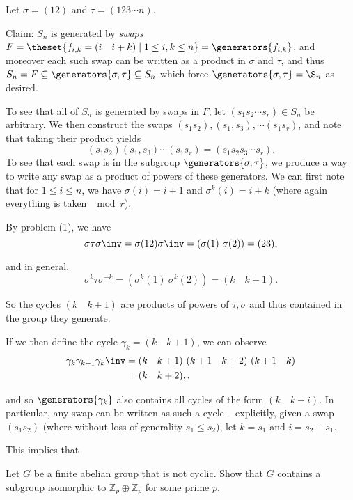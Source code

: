 \begin{solution}
  Let $\sigma= (12)$ and $\tau= (123\cdots n)$.

  Claim: $S_n$ is generated by \textit{swaps} $F = \theset{f_{i, k} = (i \quad i+k) \mid 1 \leq i, k \leq n} = \generators{f_{i, k}}$, and moreover each such swap can be written as a product in $\sigma$ and $\tau$, and thus $S_n = F \subseteq \generators{\sigma, \tau} \subseteq S_n$ which force $\generators{\sigma, \tau} = \S_n$ as desired.

  To see that all of $S_n$ is generated by swaps in $F$, let $(s_1 s_2 \cdots s_r) \in S_n$ be arbitrary. We then construct the swaps $(s_1 s_2), (s_1, s_3), \cdots (s_1 s_r)$, and note that taking their product yields
  $$
  (s_1 s_2)(s_1, s_3)\cdots(s_1 s_r) = (s_1 s_2 s_3 \cdots s_r).
  $$
  To see that each swap is in the subgroup $\generators{\sigma, \tau}$, we produce a way to write any swap as a product of powers of these generators. We can first note that for $1 \leq i \leq n$, we have $\sigma(i) = i+1$ and $\sigma^k(i) = i+k$ (where again everything is taken $\mod r$).

  By problem (1), we have
  $$
  \sigma\tau\sigma\inv = \sigma(1 2)\sigma\inv = (\sigma(1) ~\sigma(2)) = (2 3),
  $$

  and in general,
  $$
  \sigma^k\tau \sigma^{-k} = (\sigma^k(1) ~\sigma^k(2)) = (k\quad k+1).
  $$

  So the cycles $(k\quad k+1)$ are products of powers of $\tau, \sigma$ and thus contained in the group they generate.

  If we then define the cycle $\gamma_k = (k\quad k+1)$, we can observe
  \begin{align*}
    \gamma_k \gamma_{k+1}\gamma_{k}\inv &= (k\quad k+1)~(k+1\quad k+2)~(k+1 \quad k) \\
    &= (k\quad k+2),
  .\end{align*}

  and so $\generators{\gamma_k}$ also contains all cycles of the form $(k\quad k+i)$. In particular, any swap can be written as such a cycle -- explicitly, given a swap $(s_1 s_2)$ (where without loss of generality $s_1 \leq s_2)$, let $k=s_1$ and $i = s_2 - s_1$.

  This implies that

\end{solution}

\begin{problem}[Hungerford 2.2.1]
\label{prob:1.3}
Let $G$ be a finite abelian group that is not cyclic. Show that $G$ contains a subgroup isomorphic to $\mathbb{Z}_p \oplus \mathbb{Z}_p$ for some prime $p$.
\end{problem}

